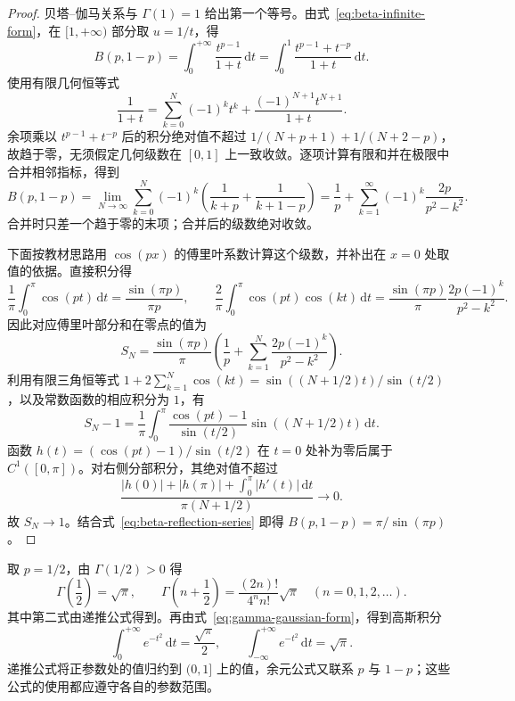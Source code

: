 \documentclass[UTF8,12pt,a4paper,fontset=fandol]{ctexbook}
\begin{document}
\begin{proof}
贝塔--伽马关系与 $\Gamma(1)=1$ 给出第一个等号。由式~\eqref{eq:beta-infinite-form}，在 $[1,+\infty)$ 部分取 $u=1/t$，得
\[
    B(p,1-p)=\int_0^{+\infty}\frac{t^{p-1}}{1+t}\,\mathrm{d}t
    =\int_0^1\frac{t^{p-1}+t^{-p}}{1+t}\,\mathrm{d}t.
\]
使用有限几何恒等式
\[
    \frac1{1+t}=\sum_{k=0}^N(-1)^kt^k
       +\frac{(-1)^{N+1}t^{N+1}}{1+t}.
\]
余项乘以 $t^{p-1}+t^{-p}$ 后的积分绝对值不超过
$1/(N+p+1)+1/(N+2-p)$，故趋于零，无须假定几何级数在 $[0,1]$ 上一致收敛。逐项计算有限和并在极限中合并相邻指标，得到
\begin{equation}
    B(p,1-p)
    =\lim_{N\to\infty}\sum_{k=0}^N(-1)^k
       \left(\frac1{k+p}+\frac1{k+1-p}\right)
    =\frac1p+\sum_{k=1}^{\infty}(-1)^k\frac{2p}{p^2-k^2}.
    \label{eq:beta-reflection-series}
\end{equation}
合并时只差一个趋于零的末项；合并后的级数绝对收敛。

下面按教材思路用 $\cos(px)$ 的傅里叶系数计算这个级数，并补出在 $x=0$ 处取值的依据。直接积分得
\[
    \frac1\pi\int_0^\pi\cos(pt)\,\mathrm{d}t
       =\frac{\sin(\pi p)}{\pi p},\qquad
    \frac2\pi\int_0^\pi\cos(pt)\cos(kt)\,\mathrm{d}t
       =\frac{\sin(\pi p)}\pi\frac{2p(-1)^k}{p^2-k^2}.
\]
因此对应傅里叶部分和在零点的值为
\[
    S_N=\frac{\sin(\pi p)}\pi
       \left(\frac1p+\sum_{k=1}^N\frac{2p(-1)^k}{p^2-k^2}\right).
\]
利用有限三角恒等式 $1+2\sum_{k=1}^N\cos(kt)=\sin((N+1/2)t)/\sin(t/2)$，以及常数函数的相应积分为 $1$，有
\[
    S_N-1=\frac1\pi\int_0^\pi
      \frac{\cos(pt)-1}{\sin(t/2)}\sin((N+1/2)t)\,\mathrm{d}t.
\]
函数 $h(t)=(\cos(pt)-1)/\sin(t/2)$ 在 $t=0$ 处补为零后属于 $C^1([0,\pi])$。对右侧分部积分，其绝对值不超过
\[
    \frac{|h(0)|+|h(\pi)|+\int_0^\pi|h'(t)|\,\mathrm{d}t}
         {\pi(N+1/2)}\longrightarrow0.
\]
故 $S_N\to1$。结合式~\eqref{eq:beta-reflection-series} 即得 $B(p,1-p)=\pi/\sin(\pi p)$。
\end{proof}

取 $p=1/2$，由 $\Gamma(1/2)>0$ 得
\begin{equation}
    \Gamma\left(\frac12\right)=\sqrt\pi,\qquad
    \Gamma\left(n+\frac12\right)
       =\frac{(2n)!}{4^n n!}\sqrt\pi\quad(n=0,1,2,\ldots).
    \label{eq:gamma-half-integer-values}
\end{equation}
其中第二式由递推公式得到。再由式~\eqref{eq:gamma-gaussian-form}，得到高斯积分
\begin{equation}
    \int_0^{+\infty}e^{-t^2}\,\mathrm{d}t=\frac{\sqrt\pi}{2},
    \qquad\int_{-\infty}^{+\infty}e^{-t^2}\,\mathrm{d}t=\sqrt\pi.
    \label{eq:gamma-gaussian-integral}
\end{equation}
递推公式将正参数处的值归约到 $(0,1]$ 上的值，余元公式又联系 $p$ 与 $1-p$；这些公式的使用都应遵守各自的参数范围。
\end{document}
